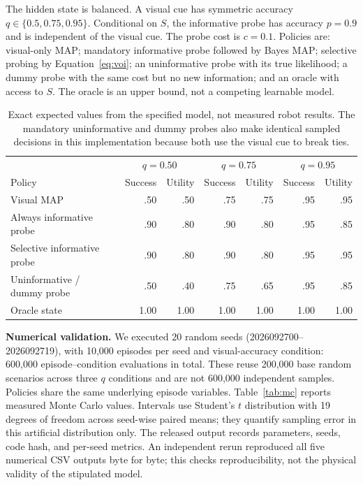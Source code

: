 \documentclass[11pt]{article}
\begin{document}
The hidden state is balanced. A visual cue has symmetric accuracy $q\in\{0.5,0.75,0.95\}$. Conditional on $S$, the informative probe has accuracy $p=0.9$ and is independent of the visual cue. The probe cost is $c=0.1$. Policies are: visual-only MAP; mandatory informative probe followed by Bayes MAP; selective probing by Equation~\ref{eq:voi}; an uninformative probe with its true likelihood; a dummy probe with the same cost but no new information; and an oracle with access to $S$. The oracle is an upper bound, not a competing learnable model.

\begin{table}[ht]
\centering\small
\begin{tabular}{@{}lrrrrrr@{}}
\toprule
& \multicolumn{2}{c}{$q=0.50$} & \multicolumn{2}{c}{$q=0.75$} & \multicolumn{2}{c}{$q=0.95$}\\
Policy & Success & Utility & Success & Utility & Success & Utility\\
\midrule
Visual MAP & .50 & .50 & .75 & .75 & .95 & .95\\
Always informative probe & .90 & .80 & .90 & .80 & .95 & .85\\
Selective informative probe & .90 & .80 & .90 & .80 & .95 & .95\\
Uninformative / dummy probe & .50 & .40 & .75 & .65 & .95 & .85\\
Oracle state & 1.00 & 1.00 & 1.00 & 1.00 & 1.00 & 1.00\\
\bottomrule
\end{tabular}
\caption{Exact expected values from the specified model, not measured robot results. The mandatory uninformative and dummy probes also make identical sampled decisions in this implementation because both use the visual cue to break ties.}
\label{tab:exact}
\end{table}

\textbf{Numerical validation.} We executed 20 random seeds (2026092700--2026092719), with 10,000 episodes per seed and visual-accuracy condition: 600,000 episode--condition evaluations in total. These reuse 200,000 base random scenarios across three $q$ conditions and are not 600,000 independent samples. Policies share the same underlying episode variables. Table~\ref{tab:mc} reports measured Monte Carlo values. Intervals use Student's $t$ distribution with 19 degrees of freedom across seed-wise paired means; they quantify sampling error in this artificial distribution only. The released output records parameters, seeds, code hash, and per-seed metrics. An independent rerun reproduced all five numerical CSV outputs byte for byte; this checks reproducibility, not the physical validity of the stipulated model.
\end{document}
